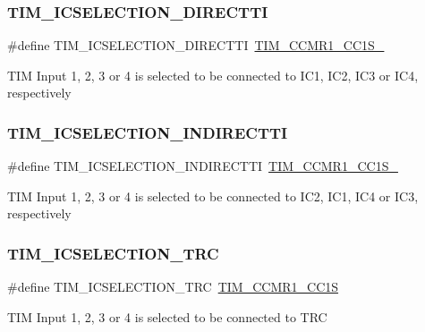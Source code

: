 \subsubsection{\texorpdfstring{TIM\_ICSELECTION\_DIRECTTI}{TIM\_ICSELECTION\_DIRECTTI}}
{\footnotesize\ttfamily \#define T\+I\+M\+\_\+\+I\+C\+S\+E\+L\+E\+C\+T\+I\+O\+N\+\_\+\+D\+I\+R\+E\+C\+T\+TI~\mbox{\hyperlink{group___peripheral___registers___bits___definition_ga1e4968b5500d58d1aebce888da31eb5d}{T\+I\+M\+\_\+\+C\+C\+M\+R1\+\_\+\+C\+C1\+S\+\_}}}

T\+IM Input 1, 2, 3 or 4 is selected to be connected to I\+C1, I\+C2, I\+C3 or I\+C4, respectively \mbox{\label{group___t_i_m___input___capture___selection_gab9754d4318abcd7fe725e3ee2e4496d4}} 
\subsubsection{\texorpdfstring{TIM\_ICSELECTION\_INDIRECTTI}{TIM\_ICSELECTION\_INDIRECTTI}}
{\footnotesize\ttfamily \#define T\+I\+M\+\_\+\+I\+C\+S\+E\+L\+E\+C\+T\+I\+O\+N\+\_\+\+I\+N\+D\+I\+R\+E\+C\+T\+TI~\mbox{\hyperlink{group___peripheral___registers___bits___definition_ga299207b757f31c9c02471ab5f4f59dbe}{T\+I\+M\+\_\+\+C\+C\+M\+R1\+\_\+\+C\+C1\+S\+\_}}}

T\+IM Input 1, 2, 3 or 4 is selected to be connected to I\+C2, I\+C1, I\+C4 or I\+C3, respectively \mbox{\label{group___t_i_m___input___capture___selection_ga9e0191bbf1a82dd9150b9283c39276e7}} 
\subsubsection{\texorpdfstring{TIM\_ICSELECTION\_TRC}{TIM\_ICSELECTION\_TRC}}
{\footnotesize\ttfamily \#define T\+I\+M\+\_\+\+I\+C\+S\+E\+L\+E\+C\+T\+I\+O\+N\+\_\+\+T\+RC~\mbox{\hyperlink{group___peripheral___registers___bits___definition_ga95291df1eaf532c5c996d176648938eb}{T\+I\+M\+\_\+\+C\+C\+M\+R1\+\_\+\+C\+C1S}}}

T\+IM Input 1, 2, 3 or 4 is selected to be connected to T\+RC 